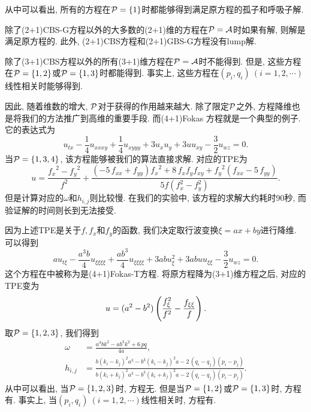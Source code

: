 从中可以看出, 所有的方程在$\mathcal{P}=\{1\}$时都能够得到满足原方程的孤子和呼吸子解. 

除了(2+1)CBS-G方程以外的大多数的(2+1)维的方程在$\mathcal{P}= \mathcal{A}$时如果有解, 则解是满足原方程的. 此外, (2+1)CBS方程和(2+1)GBS-G方程没有lump解. 

除了(3+1)CBS方程以外的所有(3+1)维方程在$\mathcal{P}= \mathcal{A}$时不能得到\TrueSol{}. 但是, 这些方程在$\mathcal{P}=\{1,2\}$或$\mathcal{P}=\{1,3\}$时都能得到\TrueSol{}. 事实上, 这些方程在$(p_i,q_i)~(i=1,2,\cdots)$线性相关时能够得到\TrueSol{}.

因此, 随着维数的增大, $\mathcal{P}$对于获得\TrueSol{}的作用越来越大. 除了限定$\mathcal{P}$之外, 方程降维也是将我们的方法推广到高维的重要手段. 而(4+1)Fokas 方程\CITEdaFokas{}就是一个典型的例子. 它的表达式为
\begin{equation}
    u_{tx}-\frac{1}{4}u_{xxxy}+\frac{1}{4}u_{xyyy}+3u_xu_y+3uu_{xy}-\frac{3}{2}u_{wz}=0. \label{Fokas}
\end{equation}
当$\mathcal{P}=\{1,3,4\}$, 该方程能够被我们的算法直接求解. 对应的TPE为
\begin{equation}
u={\frac {{f_{{x}}}^{2}-{f_{{y}}}^{2}}{{f}^{2}}}+{\frac { \left( -5\,f_{
{{ xx}}}+f_{{{ yy}}} \right) {f_{{x}}}^{2}+8\,f_{{x}}f_{{y}}f_{{
{ xy}}}+{f_{{y}}}^{2} \left( f_{{{ xx}}}-5\,f_{{{ yy}}}
\right) }{5f(f_x^2-f_y^2)}}.
\end{equation}
但是计算对应的$\omega$和$h_{i,j}$则比较慢. 在我们的实验中, 该方程的求解大约耗时90秒, 而验证解的时间则长到无法接受. 

因为上述TPE是关于$f,f_x$和$f_y$的函数, 我们决定取行波变换$\xi=ax+by$进行降维. 可以得到
\begin{equation}
    au_{t\xi}-\frac{a^3b}{4}u_{\xi\xi\xi\xi}+\frac{ab^3}{4}u_{\xi\xi\xi\xi}+3abu_{\xi}^2+3abuu_{\xi\xi}-\frac{3}{2}u_{wz}=0.  \label{Fokas-T}
\end{equation}
这个方程在中被称为是(4+1)Fokas-T方程. 将原方程降为(3+1)维方程之后, 对应的TPE变为
\begin{equation}
    u=(a^2-b^2)\left(\frac{f_{\xi}^2}{f^2}-\frac{f_{\xi\xi}}{f}\right).
\end{equation}
取$\mathcal{P}=\{1,2,3\}$, 我们得到
\begin{equation}
\begin{split}
    \omega&={\frac {{a}^{3}b{k}^{2}-a{b}^{3}{k}^{2}+6\,pq}{4a}}, \\
    h_{{i,j}}&={\frac {b \left( k_{{i}}-k_{{j}} \right) ^{2}{a}^{3}-{b}^{3}
    \left( k_{{i}}-k_{{j}} \right) ^{2}a-2\, \left( q_{{i}}-q_{{j}}
    \right)  \left( p_{{i}}-p_{{j}} \right) }{b \left( k_{{i}}+k_{{j}}
    \right) ^{2}{a}^{3}-{b}^{3} \left( k_{{i}}+k_{{j}} \right) ^{2}a-2\,
    \left( q_{{i}}-q_{{j}} \right)  \left( p_{{i}}-p_{{j}} \right) }}.
\end{split}
\end{equation}
从中可以看出, 当$\mathcal{P}=\{1,2,3\}$时, 方程无\TrueSol{}. 但是当$\mathcal{P}=\{1,2\}$或$\mathcal{P}=\{1,3\}$时, 方程有\TrueSol{}. 事实上, 当$(p_i,q_i)~(i=1,2,\cdots)$线性相关时, 方程有\TrueSol{}.

